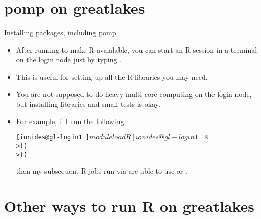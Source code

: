 \section{pomp on greatlakes}

\begin{frame}[fragile]{Installing packages, including pomp}

\begin{itemize}
\item After running  to make R avaialable, you can start an R session in a terminal on the login node just by typing .
\item This is useful for setting up all the R libraries you may need.
\item You are not supposed to do heavy multi-core computing on the login node, but installing libraries and small tests is okay.
\item For example, if I run the following:
\begin{knitrout}\small
{}\color{fgcolor}\begin{kframe}
\begin{alltt}
[ionides@gl-login1 ~]$ module load R
[ionides@gl-login1 ~]$ R
> ()
> ()
\end{alltt}
\end{kframe}
\end{knitrout}
then my subsequent R jobs run via  are able to use  or .

\end{itemize}


\end{frame}

\section{Other ways to run R on greatlakes}


